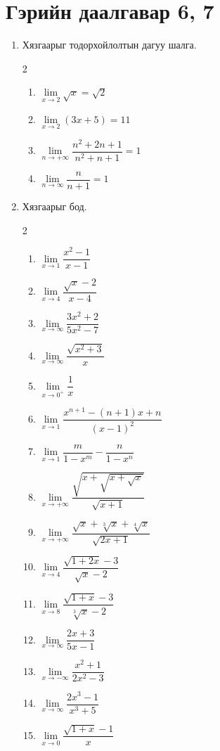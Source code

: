 \section{Гэрийн даалгавар 6, 7}
\begin{enumerate}
\item Хязгаарыг тодорхойлолтын дагуу шалга.
\begin{multicols}{2}
\begin{enumerate}
\item $\lim\limits_{x\to 2}\sqrt{x}=\sqrt{2}$ 
\item $\lim\limits_{x\to 2}(3x+5)=11$
\item $\lim\limits_{n\to +\infty}\dfrac{n^2+2n+1}{n^2+n+1}=1$
\item $\lim\limits_{n\to \infty}\dfrac{n}{n+1}=1$
\end{enumerate}
\end{multicols}
\item Хязгаарыг бод.
\begin{multicols}{2}
\begin{enumerate}
\item $\lim\limits_{x\to 1}\dfrac{x^2-1}{x-1}$
\item $\lim\limits_{x\to 4}\dfrac{\sqrt{x}-2}{x-4}$
\item $\lim\limits_{x\to \infty}\dfrac{3x^2+2}{5x^2-7}$
\item $\lim\limits_{x\to \infty}\dfrac{\sqrt{x^2+3}}{x}$
\item $\lim\limits_{x\to 0^+}\dfrac{1}{x}$
\item $\lim\limits _{x\to 1} \dfrac{x^{n+1}-(n+1)x+n}{(x-1)^2}$ 
\item $\lim\limits _{x\to 1} \dfrac{m}{1-x^m}-\dfrac{n}{1-x^n}$
\item $\lim\limits _{x\to +\infty} \dfrac{\sqrt{x+\sqrt{x+\sqrt{x}}}}{\sqrt{x+1}}$
\item $\lim\limits _{x\to +\infty} \dfrac{\sqrt{x}+\sqrt[3]{x}+\sqrt[4]{x}}{\sqrt{2x+1}}$ 
\item $\lim\limits _{x\to 4} \dfrac{\sqrt{1+2x}-3}{\sqrt{x}-2}$
\item $\lim\limits _{x\to 8} \dfrac{\sqrt{1+x}-3}{\sqrt[3]{x}-2}$
\item $\lim\limits_{x\to \infty}\dfrac{2x+3}{5x-1}$
\item $\lim\limits_{x\to -\infty}\dfrac{x^2+1}{2x^2-3}$
\item $\lim\limits_{x\to \infty}\dfrac{2x^3-1}{x^3+5}$
\item $\lim\limits_{x\to 0}\dfrac{\sqrt{1+x}-1}{x}$

\end{enumerate}
\end{multicols}
\end{enumerate}
